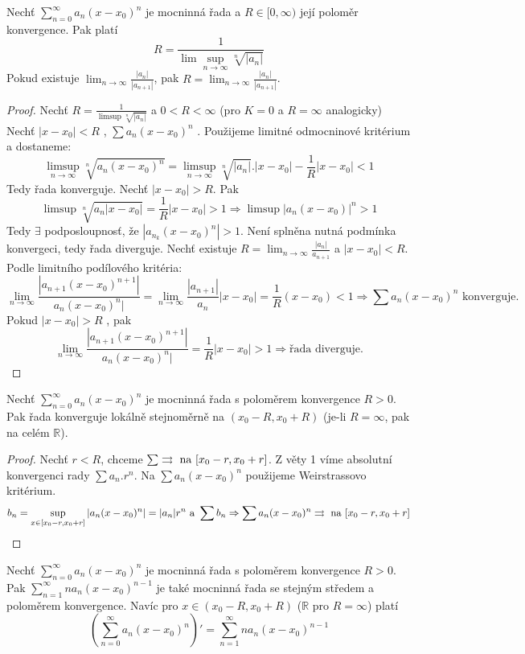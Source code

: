 \begin{vetal}
Nechť $\sum_{n=0}^{\infty} a_n (x-x_0)^n$ je mocninná řada a $R \in [ 0, \infty)$ její poloměr konvergence. Pak platí
$$R = \frac{1}{ \lim \sup_{n \rightarrow \infty} \sqrt[n]{| a_n |} }$$
Pokud existuje $\lim_{n \rightarrow \infty} \frac{|a_n|}{|a_{n+1}|}$, pak $R = \lim_{n \rightarrow \infty} \frac{|a_n|}{|a_{n+1}|}$.
\end{vetal}

\begin{proof}
Nechť $R = \frac{1}{\limsup \sqrt[n]{|a_n|}}$ a $0<R<\infty$ (pro $K = 0$ a $R = \infty$ analogicky)
Nechť $|x-x_0| < R$ , $\sum a_n(x-x_0)^n$ . Použijeme limitné odmocninové kritérium a dostaneme:
$$\limsup_{n \to \infty} \sqrt[n]{a_n(x-x_0)^n} = \limsup_{n \to \infty} \sqrt[n]{|a_n|} . |x-x_0| - \frac{1}{R} |x-x_0| < 1$$
Tedy řada konverguje.
Nechť $|x-x_0|>R$. Pak 
$$\limsup \sqrt[n]{a_n|x-x_0|} = \frac{1}{R}|x-x_0| > 1 \Rightarrow \limsup |a_n(x-x_0)|^n > 1$$
Tedy $\exists $ podposloupnosť, že $|a_{n_k} (x-x_0)^n| > 1$. Není splněna nutná podmínka konvergeci, tedy řada diverguje.
Nechť existuje $R = \lim_{n \to \infty } \frac{|a_n|}{a_{n+1}}$ a $|x-x_0|< R$. Podle limitního podílového kritéria:
$$\lim_{n \to \infty} \frac{|a_{n+1}(x-x_0)^{n+1}|}{a_n(x-x_0)^n|} = \lim_{n \to \infty} \frac{|a_{n+1}|}{a_n} |x-x_0| = \frac{1}{R} (x-x_0) < 1 \Rightarrow \sum a_n(x-x_0)^n \textrm{ konverguje.}$$
Pokud $|x-x_0| > R$ , pak 
$$\lim_{n \to \infty} \frac{|a_{n+1}(x-x_0)^{n+1}|}{a_n(x-x_0)^n|} = \frac{1}{R}|x-x_0|>1 \Rightarrow \textrm{řada diverguje.}$$
\end{proof}

\begin{vetal}
Nechť $\sum_{n=0}^{\infty} a_n (x-x_0)^n$ je mocninná řada s poloměrem konvergence $R > 0$.  Pak řada konverguje lokálně stejnoměrně na $(x_0 - R, x_0 + R)$ (je-li $R=\infty$, pak na celém $\mathbb{R}$).
\end{vetal}

\begin{proof}
Nechť $r < R$, chceme $\sum \rightrightarrows \textrm{ na } [x_0-r,x_0+r]$. Z věty 1 víme absolutní konvergenci rady $\sum a_n.r^n$. Na $ \sum a_n(x-x_0)^n$ použijeme Weirstrassovo kritérium.
$$b_n = \sup_{x \in[x_0-r, x_0+r]} |a_n(x-x_0)^n| = |a_n|r^n \textrm{ a } \sum b_n \Rightarrow \sum a_n(x-x_0)^n \rightrightarrows \textrm{ na } [x_0-r, x_0+r]$$
\end{proof}

\begin{vetal}
\label{o derivaci mocninné řady}
Nechť $\sum_{n=0}^{\infty} a_n (x-x_0)^n$ je mocninná řada s poloměrem konvergence $R > 0$. Pak $\sum_{n=1}^{\infty} n a_n (x-x_0)^{n-1}$ je také mocninná řada se stejným středem a poloměrem konvergence. Navíc pro $x \in ( x_0 - R, x_0 + R )$ ($\mathbb{R}$ pro $R = \infty$) platí
$$ \left( \sum_{n=0}^{\infty} a_n (x-x_0)^n \right)' = \sum_{n=1}^{\infty} n a_n (x-x_0)^{n-1}$$
\end{vetal}


